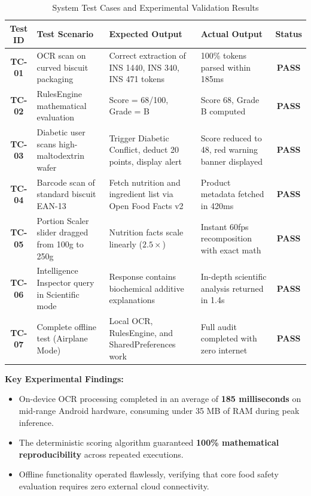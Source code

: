 \documentclass[12pt]{article}
\begin{document}
\vspace{0.5cm}

\begin{table}[h!]
\centering
\caption{System Test Cases and Experimental Validation Results}
\vspace{0.3cm}
\footnotesize
\begin{tabular}{|c|p{3.2cm}|p{3.8cm}|p{3.2cm}|c|}
\hline
\textbf{Test ID} & \textbf{Test Scenario} & \textbf{Expected Output} & \textbf{Actual Output} & \textbf{Status} \\
\hline
\textbf{TC-01} & OCR scan on curved biscuit packaging & Correct extraction of INS 1440, INS 340, INS 471 tokens & 100\% tokens parsed within 185ms & \textbf{PASS} \\
\hline
\textbf{TC-02} & RulesEngine mathematical evaluation & Score = 68/100, Grade = B & Score 68, Grade B computed & \textbf{PASS} \\
\hline
\textbf{TC-03} & Diabetic user scans high-maltodextrin wafer & Trigger Diabetic Conflict, deduct 20 points, display alert & Score reduced to 48, red warning banner displayed & \textbf{PASS} \\
\hline
\textbf{TC-04} & Barcode scan of standard biscuit EAN-13 & Fetch nutrition and ingredient list via Open Food Facts v2 & Product metadata fetched in 420ms & \textbf{PASS} \\
\hline
\textbf{TC-05} & Portion Scaler slider dragged from 100g to 250g & Nutrition facts scale linearly ($2.5\times$) & Instant 60fps recomposition with exact math & \textbf{PASS} \\
\hline
\textbf{TC-06} & Intelligence Inspector query in Scientific mode & Response contains biochemical additive explanations & In-depth scientific analysis returned in 1.4s & \textbf{PASS} \\
\hline
\textbf{TC-07} & Complete offline test (Airplane Mode) & Local OCR, RulesEngine, and SharedPreferences work & Full audit completed with zero internet & \textbf{PASS} \\
\hline
\end{tabular}
\end{table}

\vspace{0.5cm}

\noindent
\textbf{Key Experimental Findings:}
\begin{itemize}
    \item On-device OCR processing completed in an average of \textbf{185 milliseconds} on mid-range Android hardware, consuming under 35 MB of RAM during peak inference.
    \item The deterministic scoring algorithm guaranteed \textbf{100\% mathematical reproducibility} across repeated executions.
    \item Offline functionality operated flawlessly, verifying that core food safety evaluation requires zero external cloud connectivity.
\end{itemize}
\end{document}
